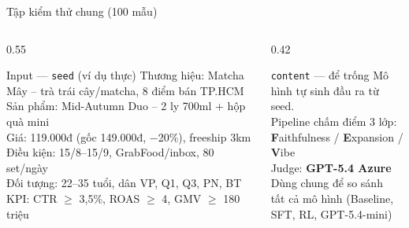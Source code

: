 \begin{frame}[t]{Tập kiểm thử chung (100 mẫu)}
  \begin{columns}[T,onlytextwidth]
    \begin{column}{0.55\textwidth}
      \begin{block}{Input --- \texttt{seed} (ví dụ thực)}
        \scriptsize
        Thương hiệu: Matcha Mây -- trà trái cây/matcha, 8 điểm bán TP.HCM\\
        Sản phẩm: Mid-Autumn Duo -- 2 ly 700ml + hộp quà mini\\
        Giá: 119.000đ (gốc 149.000đ, $-$20\%), freeship 3km\\
        Điều kiện: 15/8--15/9, GrabFood/inbox, 80 set/ngày\\
        Đối tượng: 22--35 tuổi, dân VP, Q1, Q3, PN, BT\\
        KPI: CTR $\geq$ 3,5\%, ROAS $\geq$ 4, GMV $\geq$ 180 triệu
      \end{block}
    \end{column}
    \begin{column}{0.42\textwidth}
      \begin{block}{\texttt{content} --- để trống}
        \scriptsize
        Mô hình tự sinh đầu ra từ seed.\\[0.4em]
        Pipeline chấm điểm 3 lớp:\\
        \textbf{F}aithfulness / \textbf{E}xpansion / \textbf{V}ibe\\[0.4em]
        Judge: \textbf{GPT-5.4 Azure}\\[0.4em]
        Dùng chung để so sánh\\
        tất cả mô hình (Baseline,\\
        SFT, RL, GPT-5.4-mini)
      \end{block}
    \end{column}
  \end{columns}
  \vspace{0.5em}
\end{frame}
